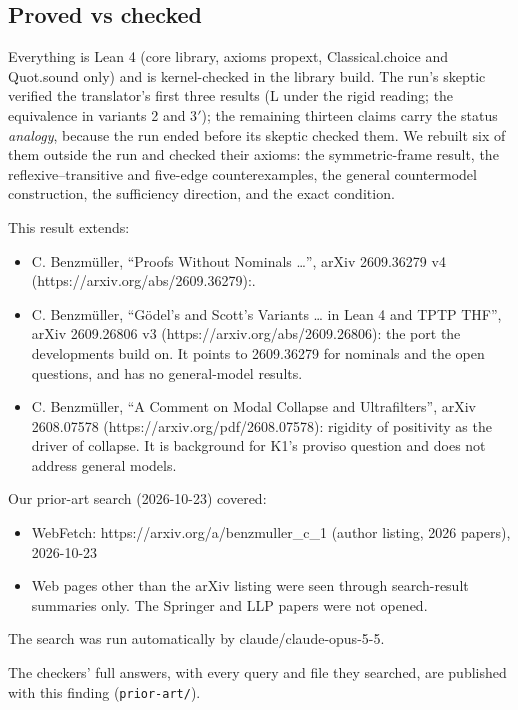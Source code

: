 \documentclass{article}
\begin{document}
\subsection*{Proved vs checked}

Everything is Lean 4 (core library, axioms propext, Classical.choice and Quot.sound only) and is
kernel-checked in the library build. The run's skeptic verified the translator's first three
results (L under the rigid reading; the equivalence in variants 2 and 3$'$); the remaining
thirteen claims carry the status \emph{analogy}, because the run ended before its skeptic checked
them. We rebuilt six of them outside the run and checked their axioms: the symmetric-frame result,
the reflexive--transitive and five-edge counterexamples, the general countermodel construction,
the sufficiency direction, and the exact condition.

This result extends:

\begin{itemize}
\item C. Benzmüller, ``Proofs Without Nominals \ldots{}'', arXiv 2609.36279 v4 (https://arxiv.org/abs/2609.36279):.
\item C. Benzmüller, ``Gödel's and Scott's Variants \ldots{} in Lean 4 and TPTP THF'', arXiv 2609.26806 v3 (https://arxiv.org/abs/2609.26806): the port the developments build on. It points to 2609.36279 for nominals and the open questions, and has no general-model results.
\item C. Benzmüller, ``A Comment on Modal Collapse and Ultrafilters'', arXiv 2608.07578 (https://arxiv.org/pdf/2608.07578): rigidity of positivity as the driver of collapse. It is background for K1's proviso question and does not address general models.
\end{itemize}

Our prior-art search (2026-10-23) covered:

\begin{itemize}
\item WebFetch: https://arxiv.org/a/benzmuller\_c\_1 (author listing, 2026 papers), 2026-10-23
\item Web pages other than the arXiv listing were seen through search-result summaries only. The Springer and LLP papers were not opened.
\end{itemize}

The search was run automatically by claude/claude-opus-5-5.

The checkers' full answers, with every query and file they searched, are published with this finding (\texttt{prior-art/}).
\end{document}
